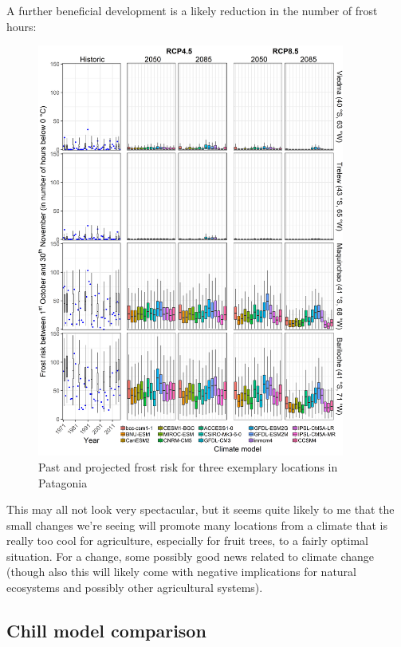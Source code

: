 \documentclass[
]{book}
\begin{document}
A further beneficial development is a likely reduction in the number of frost hours:

\begin{figure}
\centering
\includegraphics[width=0.9\textwidth,height=\textheight]{pictures/Patagonia_frost.png}
\caption{Past and projected frost risk for three exemplary locations in Patagonia}
\end{figure}

This may all not look very spectacular, but it seems quite likely to me that the small changes we're seeing will promote many locations from a climate that is really too cool for agriculture, especially for fruit trees, to a fairly optimal situation. For a change, some possibly good news related to climate change (though also this will likely come with negative implications for natural ecosystems and possibly other agricultural systems).

\hypertarget{chill-model-comparison}{%
\subsection{Chill model comparison}\label{chill-model-comparison}}
\end{document}
